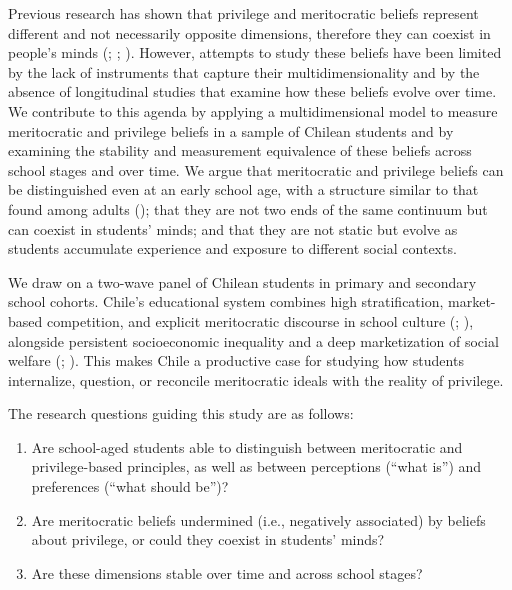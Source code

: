 \documentclass[
  11pt,
]{article}
\begin{document}
Previous research has shown that privilege and meritocratic beliefs
represent different and not necessarily opposite dimensions, therefore
they can coexist in people's minds
(;
;
). However,
attempts to study these beliefs have been limited by the lack of
instruments that capture their multidimensionality and by the absence of
longitudinal studies that examine how these beliefs evolve over time. We
contribute to this agenda by applying a multidimensional model to
measure meritocratic and privilege beliefs in a sample of Chilean
students and by examining the stability and measurement equivalence of
these beliefs across school stages and over time. We argue that
meritocratic and privilege beliefs can be distinguished even at an early
school age, with a structure similar to that found among adults
();
that they are not two ends of the same continuum but can coexist in
students' minds; and that they are not static but evolve as students
accumulate experience and exposure to different social contexts.

We draw on a two-wave panel of Chilean students in primary and secondary
school cohorts. Chile's educational system combines high stratification,
market-based competition, and explicit meritocratic discourse in school
culture (; ), alongside persistent socioeconomic inequality and a deep
marketization of social welfare
(;
). This makes Chile
a productive case for studying how students internalize, question, or
reconcile meritocratic ideals with the reality of privilege.

The research questions guiding this study are as follows:

\begin{enumerate}
\def\labelenumi{(\arabic{enumi})}
\item
  Are school-aged students able to distinguish between meritocratic and
  privilege-based principles, as well as between perceptions (``what
  is'') and preferences (``what should be'')?
\item
  Are meritocratic beliefs undermined (i.e., negatively associated) by
  beliefs about privilege, or could they coexist in students' minds?
\item
  Are these dimensions stable over time and across school stages?
\end{enumerate}
\end{document}
